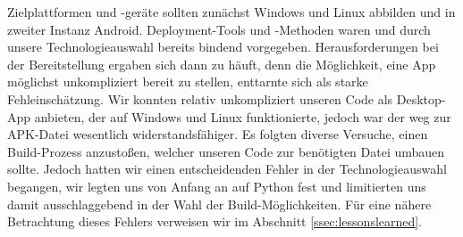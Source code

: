 		\noindent Zielplattformen und -geräte sollten zunächst Windows und Linux abbilden und in zweiter Instanz Android. Deployment-Tools und -Methoden waren und durch unsere Technologieauswahl bereits bindend vorgegeben. Herausforderungen bei der Bereitstellung ergaben sich dann zu häuft, denn die Möglichkeit, eine App möglichst unkompliziert bereit zu stellen, enttarnte sich als starke Fehleinschätzung. Wir konnten relativ unkompliziert unseren Code als Desktop-App anbieten, der auf Windows und Linux funktionierte, jedoch war der weg zur APK-Datei wesentlich widerstandsfähiger. Es folgten diverse Versuche, einen Build-Prozess anzustoßen, welcher unseren Code zur benötigten Datei umbauen sollte. Jedoch hatten wir einen entscheidenden Fehler in der Technologieauswahl begangen, wir legten uns von Anfang an auf Python fest und limitierten uns damit ausschlaggebend in der Wahl der Build-Möglichkeiten. Für eine nähere Betrachtung dieses Fehlers verweisen wir im Abschnitt \ref{ssec:lessonslearned}.
